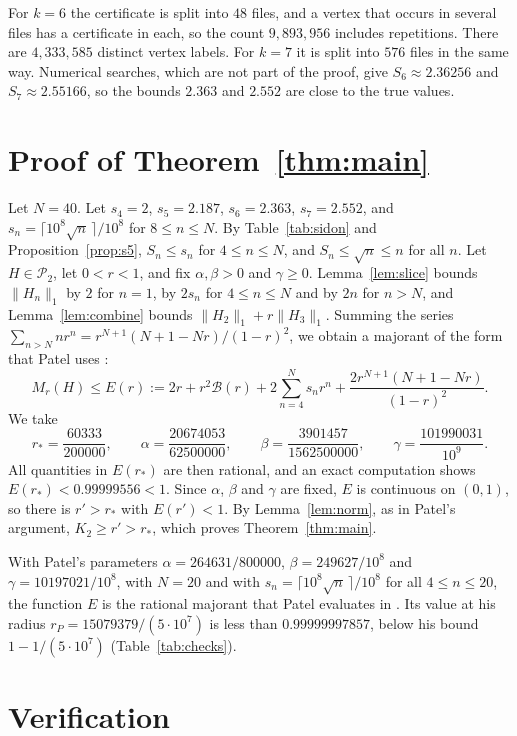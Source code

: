 \documentclass[11pt]{amsart}
\theoremstyle{remark}
\numberwithin{equation}{section}
\newcommand{\Pclass}{\mathcal{P}_2}
\newcommand{\Bfun}{\mathcal{B}}
\newcommand{\rstar}{\frac{60333}{200000}}
\newcommand{\ParA}{\frac{20674053}{62500000}}
\newcommand{\ParB}{\frac{3901457}{1562500000}}
\newcommand{\ParG}{\frac{101990031}{10^9}}
\newcommand{\FiveOwn}{2.187}
\newcommand{\TailN}{40}
\newcommand{\Evalue}{0.99999556}
\newcommand{\SixOwn}{2.363}
\newcommand{\NVertSix}{9{,}893{,}956}
\newcommand{\EvaluePatel}{0.99999997857}
\newcommand{\SevenOwn}{2.552}
\newcommand{\SevenNum}{2.55166}
\newcommand{\NFilesSeven}{576}
\begin{document}
For $k=6$ the certificate is split into $48$ files, and a vertex that occurs in several files has a certificate in each, so the count $\NVertSix$ includes repetitions. There are $4{,}333{,}585$ distinct vertex labels. For $k=7$ it is split into $\NFilesSeven$ files in the same way. Numerical searches, which are not part of the proof, give $S_6\approx2.36256$ and $S_7\approx\SevenNum$, so the bounds $\SixOwn$ and $\SevenOwn$ are close to the true values.

\section{Proof of Theorem~\ref{thm:main}}\label{sec:proof}

Let $N=\TailN$. Let $s_4=2$, $s_5=\FiveOwn$, $s_6=\SixOwn$, $s_7=\SevenOwn$, and $s_n=\lceil10^8\sqrt n\,\rceil/10^8$ for $8\le n\le N$. By Table~\ref{tab:sidon} and Proposition~\ref{prop:s5}, $S_n\le s_n$ for $4\le n\le N$, and $S_n\le\sqrt n\le n$ for all $n$. Let $H\in\Pclass$, let $0<r<1$, and fix $\alpha,\beta>0$ and $\gamma\ge0$. Lemma~\ref{lem:slice} bounds $\|H_n\|_1$ by $2$ for $n=1$, by $2s_n$ for $4\le n\le N$ and by $2n$ for $n>N$, and Lemma~\ref{lem:combine} bounds $\|H_2\|_1+r\|H_3\|_1$. Summing the series $\sum_{n>N}nr^n=r^{N+1}(N+1-Nr)/(1-r)^2$, we obtain a majorant of the form that Patel uses \cite{PatMDB}:
\[
M_r(H)\le E(r):=2r+r^2\Bfun(r)+2\sum_{n=4}^{N}s_nr^n+\frac{2r^{N+1}(N+1-Nr)}{(1-r)^2}.
\]
We take
\[
r_*=\rstar,\qquad\alpha=\ParA,\qquad\beta=\ParB,\qquad\gamma=\ParG.
\]
All quantities in $E(r_*)$ are then rational, and an exact computation shows $E(r_*)<\Evalue<1$. Since $\alpha$, $\beta$ and $\gamma$ are fixed, $E$ is continuous on $(0,1)$, so there is $r'>r_*$ with $E(r')<1$. By Lemma~\ref{lem:norm}, as in Patel's argument, $K_2\ge r'>r_*$, which proves Theorem~\ref{thm:main}.

With Patel's parameters $\alpha=264631/800000$, $\beta=249627/10^8$ and $\gamma=10197021/10^8$, with $N=20$ and with $s_n=\lceil10^8\sqrt n\,\rceil/10^8$ for all $4\le n\le20$, the function $E$ is the rational majorant that Patel evaluates in \cite{PatMDB}. Its value at his radius $r_P=15079379/(5\cdot10^7)$ is less than $\EvaluePatel$, below his bound $1-1/(5\cdot10^7)$ (Table~\ref{tab:checks}).

\section{Verification}\label{sec:verif}
\end{document}
